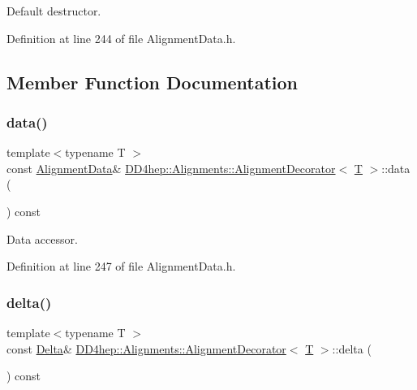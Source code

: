 Default destructor. 



Definition at line 244 of file Alignment\+Data.\+h.



\subsection{Member Function Documentation}
\hypertarget{class_d_d4hep_1_1_alignments_1_1_alignment_decorator_a33d5e92830f520adbbcfecafb45dc126}{}\label{class_d_d4hep_1_1_alignments_1_1_alignment_decorator_a33d5e92830f520adbbcfecafb45dc126} 
\subsubsection{\texorpdfstring{data()}{data()}}
{\footnotesize\ttfamily template$<$typename T $>$ \\
const \hyperlink{class_d_d4hep_1_1_alignments_1_1_alignment_data}{Alignment\+Data}\& \hyperlink{class_d_d4hep_1_1_alignments_1_1_alignment_decorator}{D\+D4hep\+::\+Alignments\+::\+Alignment\+Decorator}$<$ \hyperlink{class_t}{T} $>$\+::data (\begin{DoxyParamCaption}{ }\end{DoxyParamCaption}) const\hspace{0.3cm}{\ttfamily [inline]}}



Data accessor. 



Definition at line 247 of file Alignment\+Data.\+h.

\hypertarget{class_d_d4hep_1_1_alignments_1_1_alignment_decorator_a58a61705cac8fe6e0b5de75959491f62}{}\label{class_d_d4hep_1_1_alignments_1_1_alignment_decorator_a58a61705cac8fe6e0b5de75959491f62} 
\subsubsection{\texorpdfstring{delta()}{delta()}}
{\footnotesize\ttfamily template$<$typename T $>$ \\
const \hyperlink{class_d_d4hep_1_1_alignments_1_1_alignment_decorator_aafa729192cc27e7d36f6e9cfd3484289}{Delta}\& \hyperlink{class_d_d4hep_1_1_alignments_1_1_alignment_decorator}{D\+D4hep\+::\+Alignments\+::\+Alignment\+Decorator}$<$ \hyperlink{class_t}{T} $>$\+::delta (\begin{DoxyParamCaption}{ }\end{DoxyParamCaption}) const\hspace{0.3cm}{\ttfamily [inline]}}



